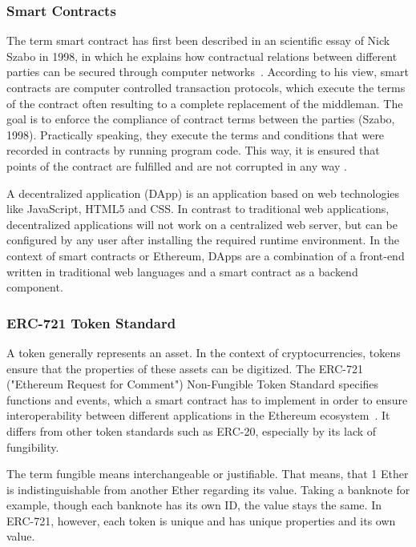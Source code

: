 \subsubsection{Smart Contracts}
The term smart contract has first been described in an scientific essay of Nick Szabo in 1998, in which he explains how contractual relations between different parties can be secured through computer networks~\cite{nickszabo1994smartcontract}. According to his view, smart contracts are computer controlled transaction protocols, which execute the terms of the contract often resulting to a complete replacement of the middleman. The goal is to enforce the compliance of contract terms between the parties (Szabo, 1998). Practically speaking, they execute the terms and conditions that were recorded in contracts by running program code. This way, it is ensured that points of the contract are fulfilled and are not corrupted in any way \cite{SmartContracts}.

A decentralized application (DApp) is an application based on web technologies like JavaScript, HTML5 and CSS. In contrast to traditional web applications, decentralized applications will not work on a centralized web server, but can be configured by any user after installing the required runtime environment. In the context of smart contracts or Ethereum, DApps are a combination of a front-end written in traditional web languages and a smart contract as a backend component.

\subsubsection{ERC-721 Token Standard} \label{sec:ERC721}

A token generally represents an asset. In the context of cryptocurrencies, tokens ensure that the properties of these assets can be digitized.
The ERC-721 ("Ethereum Request for Comment") Non-Fungible Token Standard specifies functions and events, which a smart contract has to implement in order to ensure interoperability between different applications in the Ethereum ecosystem~\cite{ERC721}. It differs from other token standards such as ERC-20, especially by its lack of fungibility.

The term fungible means interchangeable or justifiable. That means, that 1 Ether is indistinguishable from another Ether regarding its value. Taking a banknote for example, though each banknote has its own ID, the value stays the same. In ERC-721, however, each token is unique and has unique properties and its own value.

